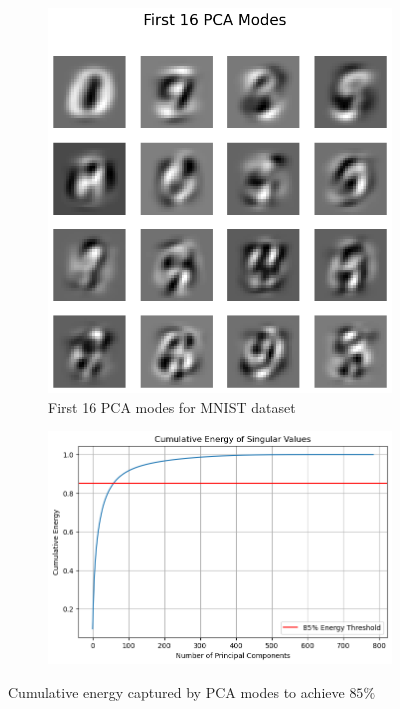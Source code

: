 \documentclass[11pt]{amsart}
\begin{document}
\begin{figure}[htbp]
    \centering
    \begin{subfigure}[b]{0.45\textwidth}
        \centering
        \includegraphics[width=\textwidth]{16_PCA.png}
        \caption{First 16 PCA modes for MNIST dataset}
        \label{fig:pca_modes}
    \end{subfigure}
    \hfill
    \begin{subfigure}[b]{0.45\textwidth}
        \centering
        \includegraphics[width=\textwidth]{Cumulative.png}
        \caption{}
        \label{fig:energy}
    \end{subfigure}
    \caption{Cumulative energy captured by PCA modes to achieve $85\%$}
    \label{fig:pca_energy}
\end{figure}
\end{document}
